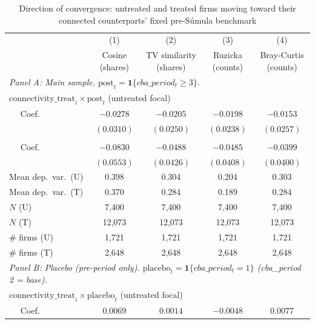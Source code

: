 \begin{table}[H]
\centering
\caption{Direction of convergence: untreated and treated firms moving toward their connected counterparts' fixed pre-Súmula benchmark}
\label{tab:direction_convergence_static}
\scriptsize
\begin{tabular}{lcccc}
\toprule\toprule
 & (1) & (2) & (3) & (4) \\
 & \shortstack{Cosine \\ (shares)} & \shortstack{TV similarity \\ (shares)} & \shortstack{Ruzicka \\ (counts)} & \shortstack{Bray-Curtis \\ (counts)} \\
\midrule
\multicolumn{5}{l}{\textit{Panel A: Main sample. $\text{post}_t = \mathbf{1}\{cba\_period_t \geq 3\}$.}} \\
\midrule
\multicolumn{5}{l}{$\text{connectivity\_treat}_i \times \text{post}_t$ \quad (untreated focal)} \\
$\quad$ Coef.\ & $-0.0278$ & $-0.0205$ & $-0.0198$ & $-0.0153$ \\
 & $(0.0310)$ & $(0.0250)$ & $(0.0238)$ & $(0.0257)$ \\
\addlinespace[2pt]
\multicolumn{5}{l}{$\text{connectivity\_untreat}_j \times \text{post}_t$ \quad (treated focal)} \\
$\quad$ Coef.\ & $-0.0830$ & $-0.0488$ & $-0.0485$ & $-0.0399$ \\
 & $(0.0553)$ & $(0.0426)$ & $(0.0408)$ & $(0.0400)$ \\
\addlinespace[2pt]
Mean dep.\ var.\ (U) & 0.398 & 0.304 & 0.204 & 0.303 \\
Mean dep.\ var.\ (T) & 0.370 & 0.284 & 0.189 & 0.284 \\
$N$ (U) & 7,400 & 7,400 & 7,400 & 7,400 \\
$N$ (T) & 12,073 & 12,073 & 12,073 & 12,073 \\
\# firms (U) & 1,721 & 1,721 & 1,721 & 1,721 \\
\# firms (T) & 2,648 & 2,648 & 2,648 & 2,648 \\
\midrule
\multicolumn{5}{l}{\textit{Panel B: Placebo (pre-period only). $\text{placebo}_t = \mathbf{1}\{cba\_period_t = 1\}$ (cba\_period 2 = base).}} \\
\midrule
\multicolumn{5}{l}{$\text{connectivity\_treat}_i \times \text{placebo}_t$ \quad (untreated focal)} \\
$\quad$ Coef.\ & $0.0069$ & $0.0014$ & $-0.0048$ & $0.0077$ \\

\end{tabular}
\end{table}
